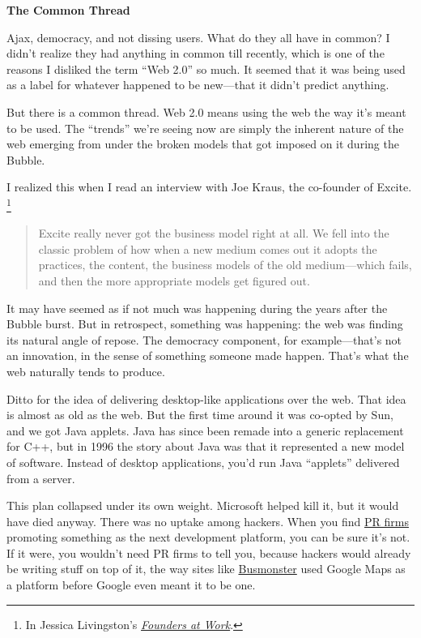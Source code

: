 \textbf{The Common Thread}

Ajax, democracy, and not dissing users. What do they all have in common?
I didn't realize they had anything in common till recently, which is one
of the reasons I disliked the term ``Web 2.0'' so much. It seemed that
it was being used as a label for whatever happened to be new---that it
didn't predict anything.

But there is a common thread. Web 2.0 means using the web the way it's
meant to be used. The ``trends'' we're seeing now are simply the
inherent nature of the web emerging from under the broken models that
got imposed on it during the Bubble.

I realized this when I read an interview with Joe Kraus, the co-founder
of Excite. \footnote{In Jessica Livingston's
\href{http://foundersatwork.com}{\emph{Founders at Work}}.}

\begin{quote}
Excite really never got the business model right at all. We fell into
the classic problem of how when a new medium comes out it adopts the
practices, the content, the business models of the old medium---which
fails, and then the more appropriate models get figured out.
\end{quote}

It may have seemed as if not much was happening during the years after
the Bubble burst. But in retrospect, something was happening: the web
was finding its natural angle of repose. The democracy component, for
example---that's not an innovation, in the sense of something someone
made happen. That's what the web naturally tends to produce.

Ditto for the idea of delivering desktop-like applications over the web.
That idea is almost as old as the web. But the first time around it was
co-opted by Sun, and we got Java applets. Java has since been remade
into a generic replacement for C++, but in 1996 the story about Java was
that it represented a new model of software. Instead of desktop
applications, you'd run Java ``applets'' delivered from a server.

This plan collapsed under its own weight. Microsoft helped kill it, but
it would have died anyway. There was no uptake among hackers. When you
find \href{submarine.html}{PR firms} promoting something as the next
development platform, you can be sure it's not. If it were, you wouldn't
need PR firms to tell you, because hackers would already be writing
stuff on top of it, the way sites like
\href{http://busmonster.com}{Busmonster} used Google Maps as a platform
before Google even meant it to be one.

